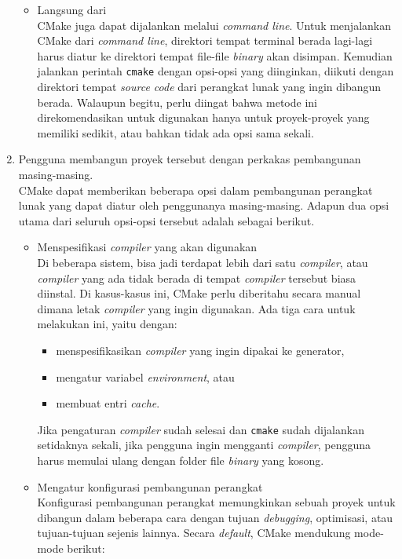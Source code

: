 \begin{enumerate}
\begin{itemize}
		\item Langsung dari \cl\\
		CMake juga dapat dijalankan melalui \textit{command line}. Untuk menjalankan CMake dari \textit{command line}, direktori tempat terminal berada lagi-lagi harus diatur ke direktori tempat file-file \textit{binary} akan disimpan. Kemudian jalankan perintah \verb|cmake| dengan opsi-opsi yang diinginkan, diikuti dengan direktori tempat \textit{source code} dari perangkat lunak yang ingin dibangun berada. Walaupun begitu, perlu diingat bahwa metode ini direkomendasikan untuk digunakan hanya untuk proyek-proyek yang memiliki sedikit, atau bahkan tidak ada opsi sama sekali.
	\end{itemize}
	
	\item Pengguna membangun proyek tersebut dengan perkakas pembangunan masing-masing.\\
	CMake dapat memberikan beberapa opsi dalam pembangunan perangkat lunak yang dapat diatur oleh penggunanya masing-masing. Adapun dua opsi utama dari seluruh opsi-opsi tersebut adalah sebagai berikut.
	
	\begin{itemize}
		\item Menspesifikasi \textit{compiler} yang akan digunakan\\
		Di beberapa sistem, bisa jadi terdapat lebih dari satu \textit{compiler}, atau \textit{compiler} yang ada tidak berada di tempat \textit{compiler} tersebut biasa diinstal. Di kasus-kasus ini, CMake perlu diberitahu secara manual dimana letak \textit{compiler} yang ingin digunakan. Ada tiga cara untuk melakukan ini, yaitu dengan:
		
		\begin{itemize}
			\item menspesifikasikan \textit{compiler} yang ingin dipakai ke generator,
			\item mengatur variabel \textit{environment}, atau
			\item membuat entri \textit{cache}.
		\end{itemize}
		
		Jika pengaturan \textit{compiler} sudah selesai dan \verb|cmake| sudah dijalankan setidaknya sekali, jika pengguna ingin mengganti \textit{compiler}, pengguna harus memulai ulang dengan folder file \textit{binary} yang kosong.
		\item Mengatur konfigurasi pembangunan perangkat\\
		Konfigurasi pembangunan perangkat memungkinkan sebuah proyek untuk dibangun dalam beberapa cara dengan tujuan \textit{debugging}, optimisasi, atau tujuan-tujuan sejenis lainnya. Secara \textit{default}, CMake mendukung mode-mode berikut:
		

\end{itemize}
\end{enumerate}
